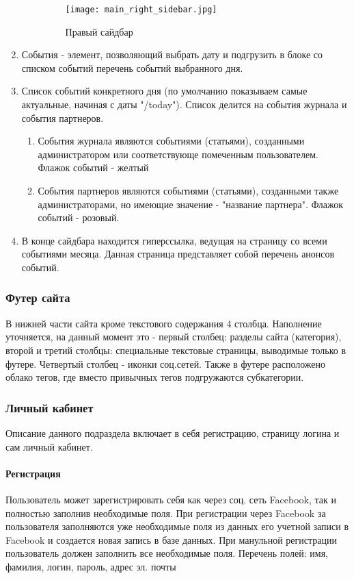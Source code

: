 \documentclass[DIV=calc, paper=a4, fontsize=11pt]{scrartcl} %
\begin{document}
\begin{enumerate}
\begin{enumerate}
            \begin{figure}[ht!]
            \centering
            \texttt{[image: main\_right\_sidebar.jpg]}
            \caption{Правый сайдбар \label{fig:main_right_sidebar.jpg}}
            \end{figure}
        \end{enumerate}
    \item События - элемент, позволяющий выбрать дату и подгрузить в блоке со списком событий перечень событий выбранного дня.
    \item Список событий конкретного дня (по умолчанию показываем самые актуальные, начиная с даты "/today"). Список делится на события журнала и события партнеров.
        \begin{enumerate}
            \item События журнала являются событиями (статьями), созданными администратором или соответствующе помеченным пользователем. Флажок событий - желтый
            \item События партнеров являются событиями (статьями), созданными также администраторами, но имеющие значение - "название партнера". Флажок событий - розовый.
        \end{enumerate}
    \item В конце сайдбара находится гиперссылка, ведущая на страницу со всеми событиями месяца. Данная страница представляет собой перечень анонсов событий.
\end{enumerate}

\subsubsection{Футер сайта}
В нижней части сайта кроме текстового содержания 4 столбца. Наполнение уточняется, на данный момент это - первый столбец: разделы сайта (категория), второй и третий столбцы: специальные текстовые страницы, выводимые только в футере. Четвертый столбец - иконки соц.сетей. Также в футере расположено облако тегов, где вместо привычных тегов подгружаются субкатегории.

\subsubsection{Личный кабинет}
Описание данного подраздела включает в себя регистрацию, страницу логина и сам личный кабинет.

\paragraph{Регистрация}
Пользователь может зарегистрировать себя как через соц. сеть Facebook, так и полностью заполнив необходимые поля. 
При регистрации через Facebook за пользователя заполняются уже необходимые поля из данных его учетной записи в Facebook и создается новая запись в базе данных. При манульной регистрации пользователь должен заполнить все необходимые поля.
Перечень полей: имя, фамилия, логин, пароль, адрес эл. почты
\end{document}
